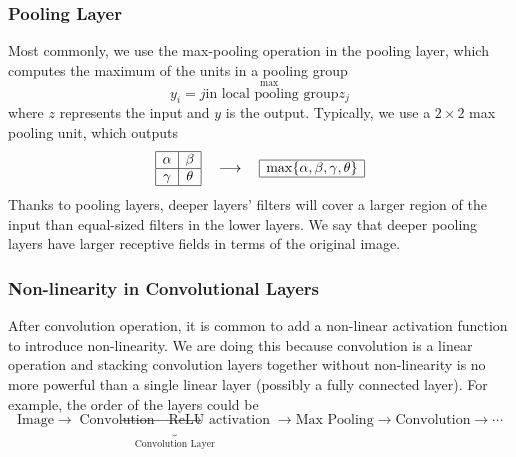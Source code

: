 \documentclass[11pt]{article}
\begin{document}
\subsubsection{Pooling Layer}
Most commonly, we use the max-pooling operation in the pooling layer, which computes the maximum of the units in a pooling group
\begin{equation}
    y_i = \overset{\max}{j \text{in local pooling group}}z_j
\end{equation}
where $z$ represents the input and $y$ is the output. Typically, we use a $2\times 2$ max pooling unit, which outputs
\begin{equation}
    \begin{array}{|c|c|}
        \hline
        \alpha & \beta \\
        \hline
        \gamma & \theta \\
        \hline
    \end{array} 
    \quad \longrightarrow
    \quad
    \begin{array}{|c|}
        \hline
            \max\{\alpha, \beta, \gamma, \theta\} \\
        \hline
    \end{array}
\end{equation}
Thanks to pooling layers, deeper layers' filters will cover a larger region of the input than equal-sized filters in the lower layers. We say that deeper pooling layers have larger receptive fields in terms of the original image. 

\subsubsection{Non-linearity in Convolutional Layers}
After convolution operation, it is common to add a non-linear activation function to introduce non-linearity. We are doing this because convolution is a linear operation and stacking convolution layers together without non-linearity is no more powerful than a single linear layer (possibly a fully connected layer). For example, the order of the layers could be
\begin{equation}
    \text{Image} \rightarrow \underbrace{\text{Convolution} \rightarrow \text{ReLU activation}}_{\text{Convolution Layer}} \rightarrow \text{Max Pooling} \rightarrow \text{Convolution} \rightarrow \cdots
\end{equation}
\end{document}
